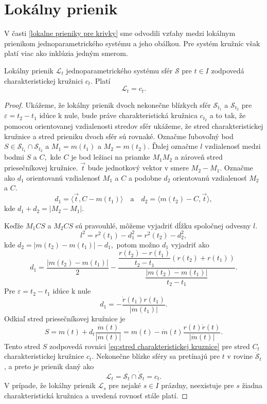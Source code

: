 \chapter{Lokálny prienik}
V časti \ref{lokalne prieniky pre krivky} sme odvodili vzťahy medzi lokálnym prienikom jednoparametrického systému a jeho obálkou. Pre systém kružníc však platí viac ako inklúzia jedným smerom.

\begin{lemma} \label{lema o lokalnom prieniku sfer}
Lokálny prienik $\mathcal{L}_{t}$ jednoparametrického systému sfér $\mathcal{S}$ pre $t \in I$ zodpovedá charakteristickej kružnici $c_{t}$. Platí $$
\mathcal{L}_{t} = c_{t}.
$$
\end{lemma}

\begin{proof}
Ukážeme, že lokálny prienik dvoch nekonečne blízkych sfér $\mathcal{S}_{t_1}$ a $\mathcal{S}_{t_2}$ pre $\varepsilon = t_2 - t_1$ idúce k nule, bude práve charakteristická kružnica $c_{t_2}$ a to tak, že pomocou orientovanej vzdialenosti stredov sfér ukážeme, že stred charakteristickej kružnice a stred prieniku dvoch sfér sú rovnaké.
Označme ľubovoľný bod $S \in \mathcal{S}_{t_1} \cap \mathcal{S}_{t_2}$ a $M_1 = m(t_1) $ a $M_2 = m(t_2).$ Ďalej označme $l$ vzdialenosť medzi bodmi $S$ a $C,$ kde $C$ je bod ležiaci na priamke $M_1M_2$ a zároveň stred priesečníkovej kružnice. $\vec{t} $ bude jednotkový vektor v smere $ M_2 - M_1.$
Označme ako $d_1$ orientovanú vzdialenosť $M_1$ a $C$ a podobne $d_2$ orientovanú vzdialenosť $M_2$ a $C.$
$$ d_1 = \langle \vec{t}, C - m(t_1) \rangle \quad \text{a} \quad d_2 = \langle m(t_2) - C,  \vec{t} \rangle, $$
kde $d_1 + d_2 = | M_2 - M_1 |.$

 Keďže $M_1CS$ a $M_2CS$ sú pravouhlé, môžeme vyjadriť dĺžku spoločnej odvesny $l.$
$$l^2 = r^2(t_1) - d^2_1 = r^2(t_2) - d^2_2,$$
kde $d_2 = |m(t_2) - m(t_1)| - d_1, $
potom možno $d_1$ vyjadriť ako 
$$d_1 = \dfrac{ | m(t_2) - m(t_1) |}{2} - \dfrac{\dfrac{r(t_2)-r(t_1)}{t_2-t_1} (r(t_2) +r(t_1))}{\dfrac{ | m(t_2)-m(t_1) |}{t_2 - t_1}}.$$
Pre $\varepsilon = t_2 - t_1 $ idúce k nule
$$ d_1 = - \dfrac{\dot{r}(t_1) r(t_1)}{| \dot{m}(t_1) |}.  $$
Odkiaľ stred priesečníkovej kružnice je
$$S = m(t) + d_t \dfrac{\dot{m}(t)}{| \dot{m}(t)|} = m(t) - \dot{m}(t)\dfrac{r(t)\dot{r}(t)}{|\dot{m}(t)|}. $$
Tento stred $S$ zodpovedá rovnici \ref{eq:stred charakteristickej kruznice} pre stred $C_t$ charakteristickej kružnice $c_t$. Nekonečne blízke sféry sa pretínajú pre $t$ v rovine $\mathcal{\dot{S}}_{t}$, a preto je prienik daný ako 
$$ \mathcal{L}_{t} = \mathcal{S}_{t} \cap \mathcal{\dot{S}}_{t} = c_{t}. $$
V prípade, že lokálny prienik $\mathcal{L}_{s}$ pre nejaké $s \in I$ prázdny, neexistuje pre $s$ žiadna charakteristická kružnica a uvedená rovnosť stále platí.
\end{proof}

